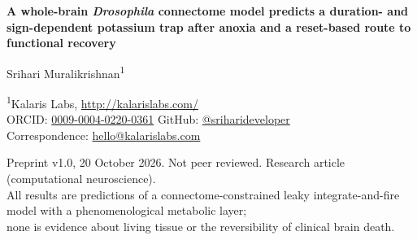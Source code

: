 \documentclass[11pt]{article}
\newcounter{none}
\begin{document}
\linenumbers
\begin{center}
{\LARGE\bfseries A whole-brain \emph{Drosophila} connectome model predicts a duration- and sign-dependent potassium trap after anoxia and a reset-based route to functional recovery\par}
\vspace{1.2em}
{\large Srihari Muralikrishnan\textsuperscript{1}\par}
\vspace{0.4em}
{\small \textsuperscript{1}Kalaris Labs, \url{http://kalarislabs.com/}\\
ORCID: \href{https://orcid.org/0009-0004-0220-0361}{0009-0004-0220-0361} \quad GitHub: \href{https://github.com/sriharideveloper}{@sriharideveloper}\\
Correspondence: \href{mailto:hello@kalarislabs.com}{hello@kalarislabs.com}\par}
\vspace{0.6em}
{\footnotesize Preprint v1.0, 20 October 2026. Not peer reviewed. Research article (computational neuroscience).\\
All results are predictions of a connectome-constrained leaky integrate-and-fire model with a phenomenological metabolic layer;\\ none is evidence about living tissue or the reversibility of clinical brain death.\par}
\end{center}
\vspace{0.4em}
\end{document}
